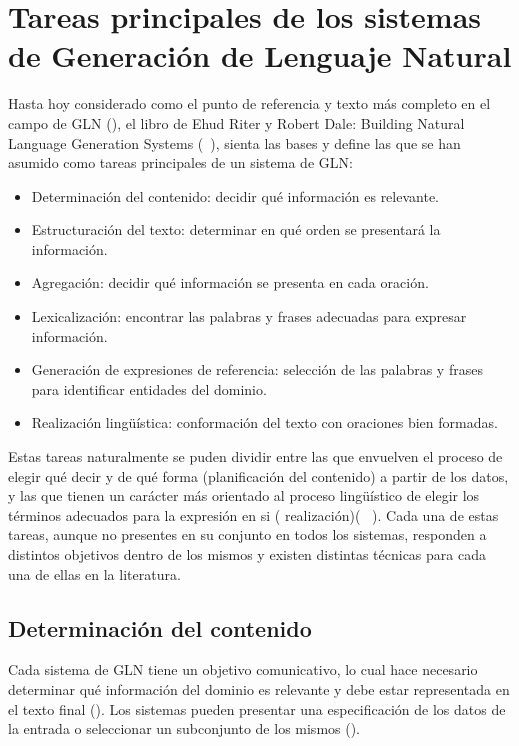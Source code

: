 \section{Tareas principales de los sistemas de Generación de Lenguaje Natural}

    Hasta hoy considerado como el punto de referencia y texto más completo en el campo de GLN (\cite{Gatt2018SurveyOT}), el libro de Ehud Riter y
Robert Dale: Building Natural Language Generation Systems (~\cite{reiter_dale_2000}), sienta las bases y define las que se han asumido como tareas principales 
de un sistema de GLN:

\begin{itemize}
    \item Determinación del contenido: decidir qué información es relevante.
    \item Estructuración del texto: determinar en qué orden se presentará la información.
    \item Agregación: decidir qué información se presenta en cada oración.
    \item Lexicalización: encontrar las palabras y frases adecuadas para expresar información.
    \item Generación de expresiones de referencia: selección de las palabras y frases para identificar entidades del dominio.
    \item Realización lingüística: conformación del texto con oraciones bien formadas.
\end{itemize}


Estas tareas naturalmente se puden dividir entre las que envuelven el proceso de elegir qué decir y de qué forma (planificación del contenido) 
a partir de los datos, y las que tienen un carácter más orientado al proceso lingüístico de elegir los términos adecuados para la expresión 
en si ( realización)( ~\cite{Gatt2018SurveyOT}). Cada una de estas tareas, aunque no presentes en su conjunto en todos los sistemas,  responden a distintos 
objetivos dentro de los mismos y existen distintas técnicas para cada una de ellas en la literatura.
    
\subsection{Determinación del contenido}\label{subsection:selecciondelcontenido}

    Cada sistema de GLN tiene un objetivo comunicativo, lo cual hace necesario determinar qué información del dominio es relevante y debe 
estar representada en el texto final (\cite{reiter_dale_2000}). Los sistemas pueden presentar una especificación de los datos de la entrada 
o seleccionar un subconjunto de los mismos (\cite{reiter_dale_2000}).

